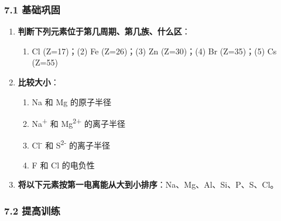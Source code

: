 \subsubsection{7.1 基础巩固}\label{ux57faux7840ux5de9ux56fa}

\begin{enumerate}
\def\labelenumi{\arabic{enumi}.}
\tightlist
\item
  \textbf{判断下列元素位于第几周期、第几族、什么区}：

  \begin{enumerate}
  \def\labelenumii{(\arabic{enumii})}
  \tightlist
  \item
    Cl (Z=17)；(2) Fe (Z=26)；(3) Zn (Z=30)；(4) Br (Z=35)；(5) Cs (Z=55)
  \end{enumerate}
\item
  \textbf{比较大小}：

  \begin{enumerate}
  \def\labelenumii{(\arabic{enumii})}
  \tightlist
  \item
    Na 和 Mg 的原子半径
  \item
    Na\textsuperscript{+} 和 Mg\textsuperscript{2+} 的离子半径
  \item
    Cl\textsuperscript{-} 和 S\textsuperscript{2-} 的离子半径
  \item
    F 和 Cl 的电负性
  \end{enumerate}
\item
  \textbf{将以下元素按第一电离能从大到小排序}：Na、Mg、Al、Si、P、S、Cl。
\end{enumerate}

\subsubsection{7.2 提高训练}\label{ux63d0ux9ad8ux8badux7ec3}

